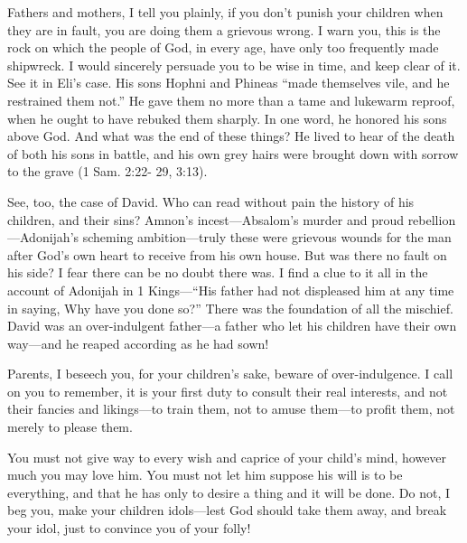 \documentclass[
]{book}
\begin{document}
Fathers and mothers, I tell you plainly, if you don't punish your children when they are in fault, you are doing them a grievous wrong. I warn you, this is the rock on which the people of God, in every age, have only too frequently made shipwreck. I would sincerely persuade you to be wise in time, and keep clear of it. See it in Eli's case. His sons Hophni and Phineas ``made themselves vile, and he restrained them not.'' He gave them no more than a tame and lukewarm reproof, when he ought to have rebuked them sharply. In one word, he honored his sons above God. And what was the end of these things? He lived to hear of the death of both his sons in battle, and his own grey hairs were brought down with sorrow to the grave (1 Sam. 2:22- 29, 3:13).

See, too, the case of David. Who can read without pain the history of his children, and their sins? Amnon's incest---Absalom's murder and proud rebellion---Adonijah's scheming ambition---truly these were grievous wounds for the man after God's own heart to receive from his own house. But was there no fault on his side? I fear there can be no doubt there was. I find a clue to it all in the account of Adonijah in 1 Kings---``His father had not displeased him at any time in saying, Why have you done so?'' There was the foundation of all the mischief. David was an over-indulgent father---a father who let his children have their own way---and he reaped according as he had sown!

Parents, I beseech you, for your children's sake, beware of over-indulgence. I call on you to remember, it is your first duty to consult their real interests, and not their fancies and likings---to train them, not to amuse them---to profit them, not merely to please them.

You must not give way to every wish and caprice of your child's mind, however much you may love him. You must not let him suppose his will is to be everything, and that he has only to desire a thing and it will be done. Do not, I beg you, make your children idols---lest God should take them away, and break your idol, just to convince you of your folly!
\end{document}

